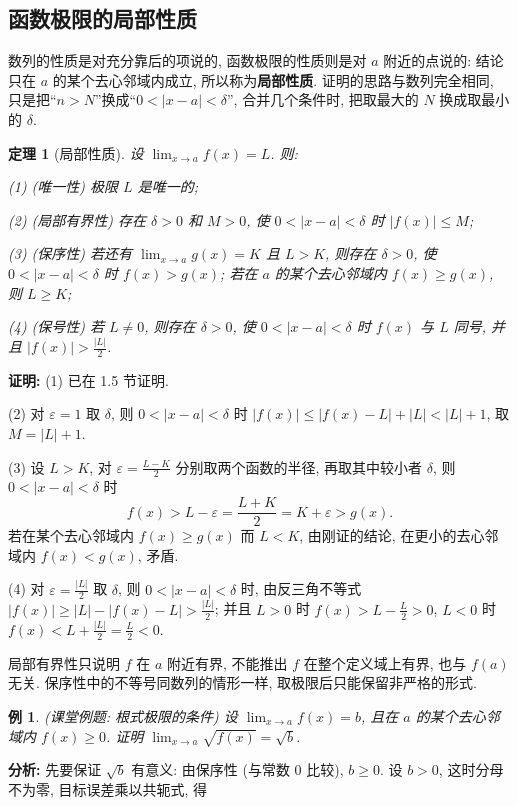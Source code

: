 \documentclass[UTF8,openany]{ctexbook}
\theoremstyle{chinesetextbook}
\newtheorem{example}{例}[section]
\newtheorem{theorem}{定理}[section]
\newenvironment{cnproof}{\par\indent\textbf{证明:} \ignorespaces}{\par}
\begin{document}
\subsection{函数极限的局部性质}
数列的性质是对充分靠后的项说的, 函数极限的性质则是对 $a$ 附近的点说的: 结论只在 $a$ 的某个去心邻域内成立, 所以称为\textbf{局部性质}. 证明的思路与数列完全相同, 只是把“$n>N$”换成“$0<|x-a|<\delta$”, 合并几个条件时, 把取最大的 $N$ 换成取最小的 $\delta$.
\begin{theorem}[局部性质]
设 $\displaystyle\lim_{x\to a}f(x)=L$. 则:

\textup{(1)} (唯一性) 极限 $L$ 是唯一的;

\textup{(2)} (局部有界性) 存在 $\delta>0$ 和 $M>0$, 使 $0<|x-a|<\delta$ 时 $|f(x)|\le M$;

\textup{(3)} (保序性) 若还有 $\displaystyle\lim_{x\to a}g(x)=K$ 且 $L>K$, 则存在 $\delta>0$, 使 $0<|x-a|<\delta$ 时 $f(x)>g(x)$; 若在 $a$ 的某个去心邻域内 $f(x)\ge g(x)$, 则 $L\ge K$;

\textup{(4)} (保号性) 若 $L\ne0$, 则存在 $\delta>0$, 使 $0<|x-a|<\delta$ 时 $f(x)$ 与 $L$ 同号, 并且 $\displaystyle|f(x)|>\frac{|L|}2$.
\end{theorem}
\begin{cnproof}
(1) 已在 1.5 节证明.

(2) 对 $\varepsilon=1$ 取 $\delta$, 则 $0<|x-a|<\delta$ 时 $|f(x)|\le|f(x)-L|+|L|<|L|+1$, 取 $M=|L|+1$.

(3) 设 $L>K$, 对 $\displaystyle\varepsilon=\frac{L-K}2$ 分别取两个函数的半径, 再取其中较小者 $\delta$, 则 $0<|x-a|<\delta$ 时
\[
f(x)>L-\varepsilon=\frac{L+K}2=K+\varepsilon>g(x).
\]
若在某个去心邻域内 $f(x)\ge g(x)$ 而 $L<K$, 由刚证的结论, 在更小的去心邻域内 $f(x)<g(x)$, 矛盾.

(4) 对 $\displaystyle\varepsilon=\frac{|L|}2$ 取 $\delta$, 则 $0<|x-a|<\delta$ 时, 由反三角不等式 $\displaystyle|f(x)|\ge|L|-|f(x)-L|>\frac{|L|}2$; 并且 $L>0$ 时 $\displaystyle f(x)>L-\frac L2>0$, $L<0$ 时 $\displaystyle f(x)<L+\frac{|L|}2=\frac L2<0$.
\end{cnproof}
局部有界性只说明 $f$ 在 $a$ 附近有界, 不能推出 $f$ 在整个定义域上有界, 也与 $f(a)$ 无关. 保序性中的不等号同数列的情形一样, 取极限后只能保留非严格的形式.
\begin{example}\label{ex:k16-1}
\textnormal{(课堂例题: 根式极限的条件)} 设 $\displaystyle\lim_{x\to a}f(x)=b$, 且在 $a$ 的某个去心邻域内 $f(x)\ge0$. 证明 $\displaystyle\lim_{x\to a}\sqrt{f(x)}=\sqrt b$.
\end{example}
\par\indent\textbf{分析:} 先要保证 $\sqrt b$ 有意义: 由保序性 (与常数 $0$ 比较), $b\ge0$. 设 $b>0$, 这时分母不为零, 目标误差乘以共轭式, 得
\end{document}
